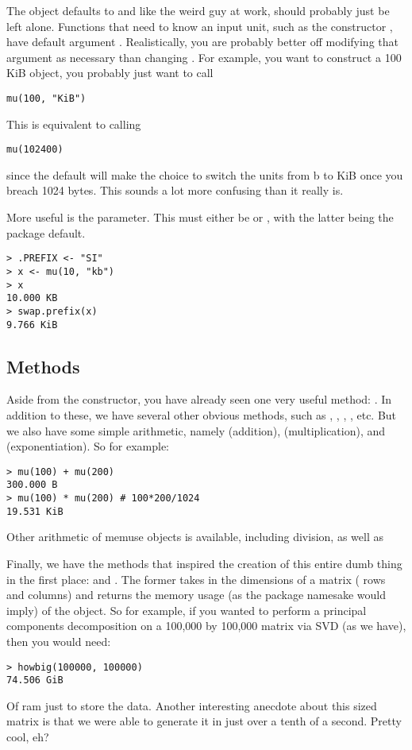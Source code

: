 The  object defaults to  and like the weird guy at work, should probably just be left alone.  Functions that need to know an input unit, such as the constructor , have default argument .  Realistically, you are probably better off modifying that argument as necessary than changing .  For example, you want to construct a 100 KiB  object, you probably just want to call
\begin{lstlisting}[language=rr]
mu(100, "KiB")
\end{lstlisting}
This is equivalent to calling
\begin{lstlisting}[language=rr]
mu(102400)
\end{lstlisting}
since the default  will make the choice to switch the units from b to KiB once you breach 1024 bytes.  This sounds a lot more confusing than it really is.

More useful is the  parameter.  This must either be  or , with the latter being the package default.  
\begin{lstlisting}[language=rr]
> .PREFIX <- "SI"
> x <- mu(10, "kb")
> x
10.000 KB
> swap.prefix(x)
9.766 KiB
\end{lstlisting}



\subsection{Methods}
Aside from the constructor, you have already seen one very useful method:  .  In addition to these, we have several other obvious methods, such as , , , , etc.  But we also have some simple arithmetic, namely  (addition),  (multiplication), and  (exponentiation).  So for example:
\begin{lstlisting}[language=rr]
> mu(100) + mu(200)
300.000 B
> mu(100) * mu(200) # 100*200/1024
19.531 KiB
\end{lstlisting}
Other arithmetic of memuse objects is available, including division, as well as 

Finally, we have the methods that inspired the creation of this entire dumb thing in the first place:   and .  The former takes in the dimensions of a matrix ( rows and  columns) and returns the memory usage (as the package namesake would imply) of the object.  So for example, if you wanted to perform a principal components decomposition on a 100,000 by 100,000 matrix via SVD (as we have), then you would need:
\begin{lstlisting}
> howbig(100000, 100000)
74.506 GiB
\end{lstlisting}
Of ram just to store the data.  Another interesting anecdote about this sized matrix is that we were able to generate it in just over a tenth of a second.  Pretty cool, eh?

